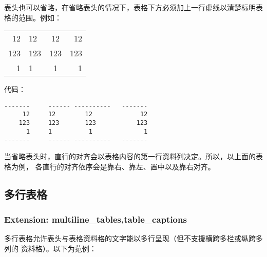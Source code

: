 \documentclass[cn]{elegantbook}
\begin{document}
表头也可以省略，在省略表头的情况下，表格下方必须加上一行虚线以清楚标明表格的范围。例如：

\begin{longtable}[]{@{}rlcr@{}}
\toprule
\endhead
12 & 12 & 12 & 12\tabularnewline
123 & 123 & 123 & 123\tabularnewline
1 & 1 & 1 & 1\tabularnewline
\bottomrule
\end{longtable}

代码：

\begin{lstlisting}
-------     ------ ----------   -------
     12     12        12             12
    123     123       123           123
      1     1          1              1
-------     ------ ----------   -------
\end{lstlisting}

当省略表头时，直行的对齐会以表格内容的第一行资料列决定。所以，以上面的表格为例，
各直行的对齐依序会是靠右、靠左、置中以及靠右对齐。

\hypertarget{ux591aux884cux8868ux683c}{%
\subsection{多行表格}\label{ux591aux884cux8868ux683c}}

\hypertarget{extension-multiline_tablestable_captions}{%
\subsubsection{Extension:
multiline\_tables,table\_captions}\label{extension-multiline_tablestable_captions}}

多行表格允许表头与表格资料格的文字能以多行呈现（但不支援横跨多栏或纵跨多列的
资料格）。以下为范例：
\end{document}
